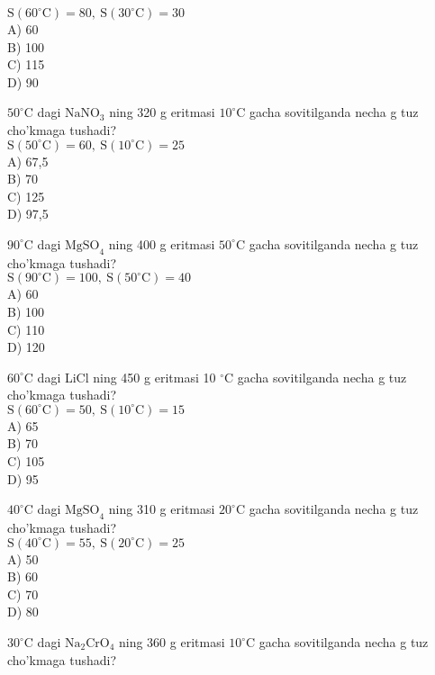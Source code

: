 $\mathrm{S}\left(60^{\circ} \mathrm{C}\right)=80, \mathrm{~S}\left(30^{\circ} \mathrm{C}\right)=30$\\
A) 60\\
B) 100\\
C) 115\\
D) 90
  \item $50^{\circ} \mathrm{C}$ dagi $\mathrm{NaNO}_{3}$ ning 320 g eritmasi $10^{\circ} \mathrm{C}$ gacha sovitilganda necha g tuz cho'kmaga tushadi?\\
$\mathrm{S}\left(50^{\circ} \mathrm{C}\right)=60, \mathrm{~S}\left(10^{\circ} \mathrm{C}\right)=25$\\
A) 67,5\\
B) 70\\
C) 125\\
D) 97,5
  \item $90^{\circ} \mathrm{C}$ dagi $\mathrm{MgSO}_{4}$ ning 400 g eritmasi $50^{\circ} \mathrm{C}$ gacha sovitilganda necha g tuz cho'kmaga tushadi?\\
$\mathrm{S}\left(90^{\circ} \mathrm{C}\right)=100, \mathrm{~S}\left(50^{\circ} \mathrm{C}\right)=40$\\
A) 60\\
B) 100\\
C) 110\\
D) 120
  \item $60^{\circ} \mathrm{C}$ dagi LiCl ning 450 g eritmasi 10 ${ }^{\circ} \mathrm{C}$ gacha sovitilganda necha g tuz cho'kmaga tushadi?\\
$\mathrm{S}\left(60^{\circ} \mathrm{C}\right)=50, \mathrm{~S}\left(10^{\circ} \mathrm{C}\right)=15$\\
A) 65\\
B) 70\\
C) 105\\
D) 95
  \item $40^{\circ} \mathrm{C}$ dagi $\mathrm{MgSO}_{4}$ ning 310 g eritmasi $20^{\circ} \mathrm{C}$ gacha sovitilganda necha g tuz cho'kmaga tushadi?\\
$\mathrm{S}\left(40^{\circ} \mathrm{C}\right)=55, \mathrm{~S}\left(20^{\circ} \mathrm{C}\right)=25$\\
A) 50\\
B) 60\\
C) 70\\
D) 80
  \item $30^{\circ} \mathrm{C}$ dagi $\mathrm{Na}_{2} \mathrm{CrO}_{4}$ ning 360 g eritmasi $10^{\circ} \mathrm{C}$ gacha sovitilganda necha g tuz cho'kmaga tushadi?\\
